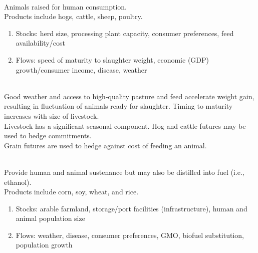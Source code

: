 \begin{remark}  \\
Animals raised for human consumption.\\
Products include hogs, cattle, sheep, poultry.
\begin{enumerate}[label=\roman*.]
\setlength{\itemsep}{0pt}
\item Stocks: herd size, processing plant capacity, consumer preferences, feed availability/cost
\item Flows: speed of maturity to slaughter weight, economic (GDP) growth/consumer income, disease, weather
\end{enumerate}
\end{remark}

\begin{remark} \\
Good weather and access to high-quality pasture and feed accelerate weight gain, resulting in fluctuation of animals ready for slaughter. Timing to maturity increases with size of livestock.\\
Livestock has a significant seasonal component. Hog and cattle futures may be used to hedge commitments.\\
Grain futures are used to hedge against cost of feeding an animal.
\end{remark}

\begin{remark}  \\
Provide human and animal sustenance but may also be distilled into fuel (i.e., ethanol).\\
Products include corn, soy, wheat, and rice.
\begin{enumerate}[label=\roman*.]
\setlength{\itemsep}{0pt}
\item Stocks: arable farmland, storage/port facilities (infrastructure), human and animal population size
\item Flows: weather, disease, consumer preferences, GMO, biofuel substitution, population growth
\end{enumerate}
\end{remark}

